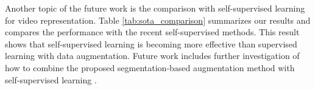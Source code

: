 Another topic of the future work is the comparison with self-supervised learning for video representation.
Table \ref{tab:sota_comparison} summarizes our results and compares the performance with the recent self-supervised methods.
This result shows that
self-supervised learning is becoming more effective than supervised learning with data augmentation.
Future work includes further investigation of how to combine the proposed segmentation-based augmentation method with self-supervised learning \cite{Kugelgen2021NeurIPS}.






